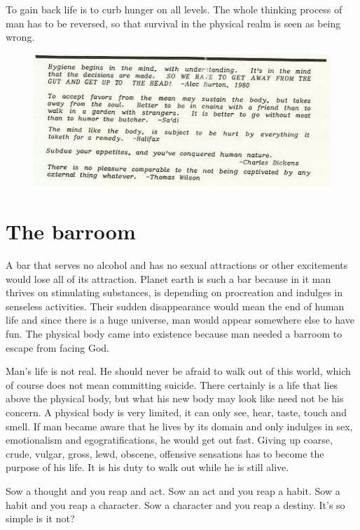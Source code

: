 \documentclass[12pt,letterpaper]{article}
\begin{document}
To gain back life is to curb hunger on all levels. The whole thinking
process of man has to be reversed, so that survival in the physical
realm is seen as being wrong.

\begin{figure} \centering
  \includegraphics[width=\textwidth]{p31.jpg}
\end{figure}


\section{The barroom}
\label{sec:tb}

A bar that serves no alcohol and has no sexual attractions or other
excitements would lose all of its attraction. Planet earth is such a
bar because in it man thrives on stimulating substances, is depending
on procreation and indulges in senseless activities. Their sudden
disappearance would mean the end of human life and since there is a
huge universe, man would appear somewhere else to have fun. The
physical body came into existence because man needed a barroom to
escape from facing God.

Man's life is not real. He should never be afraid to walk out of this
world, which of course does not mean committing suicide. There
certainly is a life that lies above the physical body, but what his
new body may look like need not be his concern. A physical body is
very limited, it can only see, hear, taste, touch and smell. If man
became aware that he lives by its domain and only indulges in sex,
emotionalism and egogratifications, he would get out fast. Giving up
coarse, crude, vulgar, gross, lewd, obscene, offensive sensations has
to become the purpose of his life. It is his duty to walk out while he
is still alive.

Sow a thought and you reap and act. Sow an act and you reap a
habit. Sow a habit and you reap a character. Sow a character and you
reap a destiny. It's so simple is it not?
\end{document}
